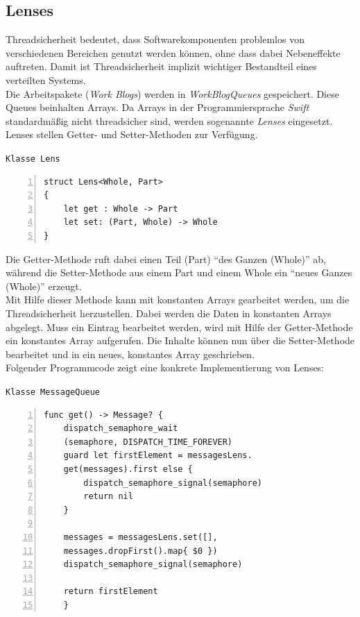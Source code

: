 \subsection{Lenses}
Threadsicherheit bedeutet, dass Softwarekomponenten problemlos von verschiedenen Bereichen genutzt werden können, ohne dass dabei Nebeneffekte auftreten. Damit ist Threadsicherheit implizit wichtiger Bestandteil eines verteilten Systems. \\
Die Arbeitspakete (\emph{Work Blogs}) werden in \emph{WorkBlogQueues} gespeichert. Diese Queues beinhalten Arrays. Da Arrays in der Programmiersprache \emph{Swift} standardmäßig nicht threadsicher sind, werden sogenannte \emph{Lenses} eingesetzt. \\
Lenses stellen Getter- und Setter-Methoden zur Verfügung. 

\texttt{Klasse Lens}
\begin{lstlisting}[basicstyle=\ttfamily,numbers=left,numberstyle=\footnotesize\ttfamily,backgroundcolor=\color{sourcegray}]
struct Lens<Whole, Part> 
{
	let get : Whole -> Part
	let set: (Part, Whole) -> Whole
}
\end{lstlisting}

Die Getter-Methode ruft dabei einen Teil (Part) \enquote{des Ganzen (Whole)} ab, während die Setter-Methode aus einem Part und einem Whole ein \enquote{neues Ganzes (Whole)} erzeugt. \\
Mit Hilfe dieser Methode kann mit konstanten Arrays gearbeitet werden, um die Threadsicherheit herzustellen. Dabei werden die Daten in konstanten Arrays abgelegt. Muss ein Eintrag bearbeitet werden, wird mit Hilfe der Getter-Methode ein konstantes Array aufgerufen. Die Inhalte können nun über die Setter-Methode bearbeitet und in ein neues, konstantes Array geschrieben.\\
Folgender Programmcode zeigt eine konkrete Implementierung von Lenses:

\texttt{Klasse MessageQueue}
\begin{lstlisting}[basicstyle=\ttfamily,numbers=left,numberstyle=\footnotesize\ttfamily,backgroundcolor=\color{sourcegray}]
func get() -> Message? {
	dispatch_semaphore_wait
	(semaphore, DISPATCH_TIME_FOREVER)
	guard let firstElement = messagesLens.
	get(messages).first else {
		dispatch_semaphore_signal(semaphore)
        return nil
	}
        
	messages = messagesLens.set([], 
	messages.dropFirst().map{ $0 })
	dispatch_semaphore_signal(semaphore)
            
	return firstElement
    }
\end{lstlisting}

